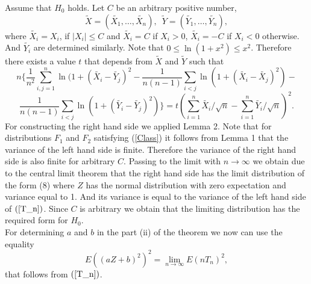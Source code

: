 \documentclass{svproc}
\begin{document}
Assume that $H_0$ holds. Let  $C$ be an arbitrary positive number,
$$
\tilde{X}=(\tilde{X_{1}},\ldots,\tilde{X_{n}}),\,\,\,
\tilde{Y}=(\tilde{Y_{1}},\ldots, \tilde{Y_{n}}),
$$
where $\tilde{X_{i}}=X_{i}$, if $
|X_{i}| \leq C$ and
 $\tilde{X_i}=C$ if $X_{i}>0$,
  $\tilde{X_i}=-C$ if $X_{i}<0$ otherwise. And $\tilde{Y_{i}}$ are determined similarly. Note that  $0 \leq \ln (1+x^2) \leq x^2$. Therefore there exists a value $t$ that depends from $\tilde{X}$ and $\tilde{Y}$ such that
\begin{equation}
n\{\frac{1}{n^2}\sum_{i,j=1}^n \ln(1 + (\tilde{X_{i}} - \tilde{Y_j})^2 -\frac{1}{n(n-1)}\sum_{i<j} \ln(1 + (\tilde{X_i} - \tilde{X_j})^2) -
\end{equation}
\begin{equation}\label{T_n}
 \frac{1}{n(n-1)}\sum_{i<j}  \ln(1 + (\tilde{Y_i} - \tilde{Y_j})^2)\}=
t
(\sum_{i=1}^n \tilde{X_{i}}/\sqrt{n}-\sum_{i=1}^n \tilde{Y_{i}}/\sqrt{n})^2.
\end{equation}
For constructing the right hand side we applied Lemma 2.
Note  that for distributions $F_1$ and $F_2$  satisfying (\ref{Class}) it follows from Lemma 1 that the variance of the left hand side is finite. Therefore the variance of the right hand side is also finite for arbitrary $C$.
Passing to the limit with $n\to \infty$ we obtain due to the central limit theorem that the right hand side has the limit distribution of the form (8) where  $Z$ has the normal distribution with zero expectation and variance equal to 1. And its variance  is equal to the variance of the left hand side  of $(\ref{T_n})$. Since $C$ is arbitrary we obtain that the limiting distribution has the required form for $H_0$. \\
 For determining $a$ and $b$ in the part (ii) of the theorem  we now can use the equality
 \begin{equation}\label{identity}
 E((aZ+b)^2)^2 =\lim_{n \to \infty}
 E(nT_n)^2,
 \end{equation}
 that follows from  $(\ref{T_n})$.
\end{document}
